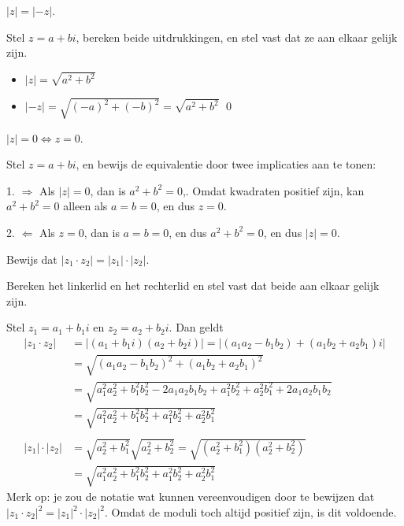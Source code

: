 \documentclass{ximera}
\begin{document}
\begin{onlineOnly}
\begin{exercise}
	\begin{question} $|z|= |-z|$.
		\begin{oplossing} Stel $z=a+bi$, bereken beide uitdrukkingen, en stel vast dat ze aan elkaar gelijk zijn.
			\begin{itemize}
				\item $| z| = \sqrt{a^2+b^2}$
				\item $|-z| = \sqrt{(-a)^2+(-b)^2} = \sqrt{a^2+b^2}$ \qed
			\end{itemize}
		\end{oplossing}
	\end{question}
		
	\begin{question} $|z| = 0 \iff z = 0$.
		\begin{oplossing}
			Stel $z=a+bi$, en bewijs de equivalentie door twee implicaties aan te tonen:
			
			1. $\boxed{\Rightarrow}$ Als $|z| = 0$, dan is $a^2+b^2 = 0$,. Omdat kwadraten positief zijn, kan $a^2+b^2=0$  alleen als $a=b=0$, en dus $z = 0$.
			
			2. $\boxed{\Leftarrow}$ Als $z = 0$, dan is $a=b=0$, en dus $a^2+b^2 = 0$, en dus $|z| = 0$.
			
		\end{oplossing}
	\end{question}
	
	\begin{question}  Bewijs dat $|z_1\cdot z_2| = |z_1| \cdot |z_2|$.
		\begin{hint} Bereken het linkerlid en het rechterlid en stel vast dat beide aan elkaar gelijk zijn.
		\end{hint}
		\begin{oplossing}
			Stel $z_1=a_1+b_1i$ en $z_2=a_2+b_2i$. Dan geldt
			$$
			\begin{array}{rl}
			|z_1\cdot z_2| & = | (a_1+b_1i)(a_2+b_2i) | = |  (a_1a_2 - b_1b_2) + (a_1b_2+a_2b_1)i| \\
			& = \sqrt{ (a_1a_2 - b_1b_2)^2 + (a_1b_2+a_2b_1)^2}  \\
			&= \sqrt{ a_1^2a_2^2  + b_1^2b_2^2 -2a_1a_2b_1b_2 + a_1^2b_2^2 + a_2^2b_1^2 + 2a_1a_2b_1b_2}  \\
			&= \sqrt{ a_1^2a_2^2  + b_1^2b_2^2 + a_1^2b_2^2 + a_2^2b_1^2 }  \\
			\\
			|z_1|\cdot| z_2| & = \sqrt{a_2^2+b_1^2}\sqrt{a_2^2+b_2^2}= \sqrt{(a_2^2+b_1^2)(a_2^2+b_2^2)} \\
			&= \sqrt{ a_1^2a_2^2  + b_1^2b_2^2 + a_1^2b_2^2 + a_2^2b_1^2 }  
			\end{array}
			$$
			Merk op: je zou de notatie wat kunnen vereenvoudigen door te bewijzen dat $|z_1\cdot z_2|^2 = |z_1|^2 \cdot |z_2|^2$. Omdat de moduli toch altijd positief zijn, is dit voldoende.
		\end{oplossing}
	\end{question}
\end{exercise}


\end{onlineOnly}
\end{document}
